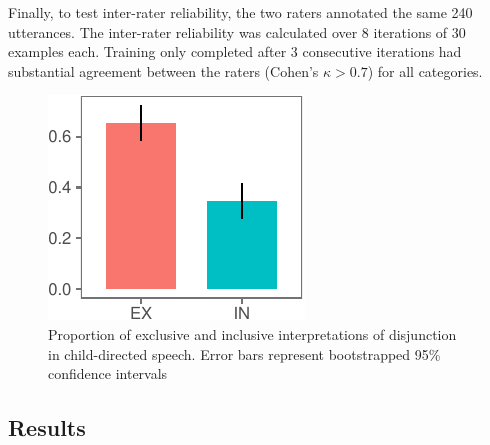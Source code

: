 \documentclass[10pt, letterpaper]{article}
\newenvironment{CodeChunk}{}{}
\begin{document}
Finally, to test inter-rater reliability, the two raters annotated the
same 240 utterances. The inter-rater reliability was calculated over 8
iterations of 30 examples each. Training only completed after 3
consecutive iterations had substantial agreement between the raters
(Cohen's \(\kappa > 0.7\)) for all categories.

\begin{CodeChunk}
\begin{figure}[b]

{\centering \includegraphics{figs/interpretation-1} 

}

\caption[Proportion of exclusive and inclusive interpretations of disjunction in child-directed speech]{Proportion of exclusive and inclusive interpretations of disjunction in child-directed speech. Error bars represent bootstrapped 95\% confidence intervals}\label{fig:interpretation}
\end{figure}
\end{CodeChunk}

\subsection{Results}\label{results-1}
\end{document}

